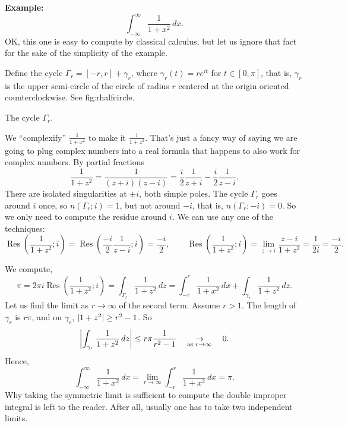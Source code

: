 \documentclass[10pt,aspectratio=169]{beamer}
\begin{document}
\begin{frame}

\textbf{Example:}
\begin{equation*}
\int_{-\infty}^\infty \frac{1}{1+x^2} \, dx .
\end{equation*}
OK\@, this one is easy to compute by classical calculus, but let us ignore
that fact for the sake of the simplicity of the example.

Define the cycle $\Gamma_r = [-r,r] + \gamma_r$, where $\gamma_r(t) =
re^{it}$ for $t \in [0,\pi]$, that is, $\gamma_r$ is the upper semi-circle
of the circle of radius $r$ centered at the origin oriented counterclockwise.
See {fig:rhalfcircle}.


The cycle $\Gamma_r$.

We ``complexify''
$\frac{1}{1+x^2}$ to make it $\frac{1}{1+z^2}$.
That's just a fancy way of saying we are going to plug complex numbers
into a real formula that happens to also work for complex numbers.
By partial fractions
\begin{equation*}
\frac{1}{1+z^2} = \frac{1}{(z+i)(z-i)} =
\frac{i}{2} \frac{1}{z+i} - 
\frac{i}{2} \frac{1}{z-i} .
\end{equation*}
There are isolated singularities at $\pm i$, both simple poles.  The cycle
$\Gamma_r$ goes around $i$ once, so $n(\Gamma_r;i) = 1$,
but not around $-i$, that is, $n(\Gamma_r;-i) = 0$.
So we only need to compute
the residue around $i$.  We can use any one of the techniques:
\begin{equation*}
\operatorname{Res}\left(\frac{1}{1+z^2};i\right) =
\operatorname{Res}\left(
\frac{-i}{2} \frac{1}{z-i};
i\right) = \frac{-i}{2} ,
\qquad
\operatorname{Res}\left(\frac{1}{1+z^2};i\right) =
\lim_{z \to i} \frac{z-i}{1+z^2}
=
\frac{1}{2i} = \frac{-i}{2}.
\end{equation*}

We compute,
\begin{equation*}
\pi 
=
2 \pi i \operatorname{Res}\left(\frac{1}{1+z^2};i\right) =
\int_{\Gamma_r} \frac{1}{1+z^2} \, dz
=
\int_{-r}^r \frac{1}{1+x^2} \, dx
+
\int_{\gamma_r} \frac{1}{1+z^2} \, dz .
\end{equation*}
Let us find the limit as $r \to \infty$ of the second term.
Assume $r > 1$.
The length of $\gamma_r$ is $r\pi$,
and on $\gamma_r$,
$\lvert {1+z^2} \rvert \geq r^2-1$.  So
\begin{equation*}
\left\lvert {
\int_{\gamma_r} \frac{1}{1+z^2} \, dz 
} \right\rvert
\leq
r \pi \frac{1}{r^2-1}
\quad\underset{\text{as } r \to \infty}{\to}\quad 0 .
\end{equation*}
Hence,
\begin{equation*}
\int_{-\infty}^\infty
\frac{1}{1+x^2} \, dx
=
\lim_{r\to \infty} \int_{-r}^r 
\frac{1}{1+x^2} \, dx
= \pi .
\end{equation*}
Why taking the symmetric limit is sufficient to compute the double improper
integral is left to the reader.  After all, usually one has to
take two independent limits.



\end{frame}
\end{document}
